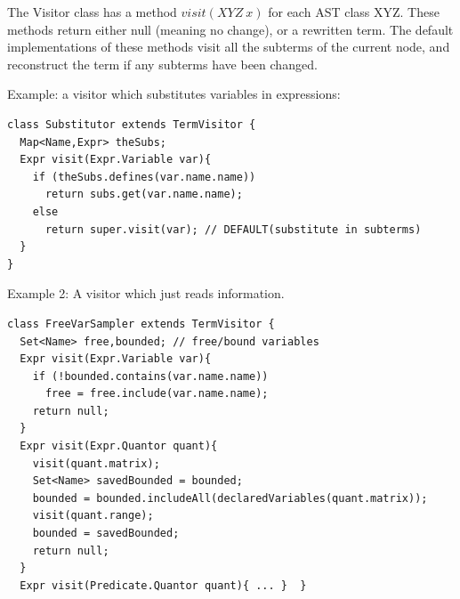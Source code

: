 \begin{slide}

The Visitor class has a method $visit(XYZ\ x)$ for each AST class XYZ.
These methods return either null (meaning no change), or a 
rewritten term. The default implementations of these methods
visit all the subterms of the current node, and reconstruct the 
term if any subterms have been changed.

Example: a visitor which substitutes variables in expressions: 
\begin{small}
\begin{verbatim}
class Substitutor extends TermVisitor {
  Map<Name,Expr> theSubs;
  Expr visit(Expr.Variable var){
    if (theSubs.defines(var.name.name))
      return subs.get(var.name.name);
    else 
      return super.visit(var); // DEFAULT(substitute in subterms)
  }
}
\end{verbatim} 
\end{small}

Example 2: A visitor which just reads information.
\begin{small}
\begin{verbatim}
class FreeVarSampler extends TermVisitor {
  Set<Name> free,bounded; // free/bound variables
  Expr visit(Expr.Variable var){
    if (!bounded.contains(var.name.name))
      free = free.include(var.name.name);
    return null; 
  }
  Expr visit(Expr.Quantor quant){
    visit(quant.matrix);
    Set<Name> savedBounded = bounded;
    bounded = bounded.includeAll(declaredVariables(quant.matrix));
    visit(quant.range);
    bounded = savedBounded;
    return null;
  }
  Expr visit(Predicate.Quantor quant){ ... }  }
\end{verbatim}
\end{small}
\end{slide}

